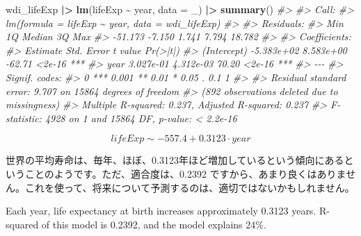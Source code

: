 \documentclass[
  xelatex, ja=standard]{bxjsbook}
\newenvironment{Shaded}{\begin{snugshade}}{\end{snugshade}}
\newcommand{\AttributeTok}[1]{\textcolor[rgb]{0.13,0.29,0.53}{#1}}
\newcommand{\CommentTok}[1]{\textcolor[rgb]{0.56,0.35,0.01}{\textit{#1}}}
\newcommand{\FunctionTok}[1]{\textcolor[rgb]{0.13,0.29,0.53}{\textbf{#1}}}
\newcommand{\NormalTok}[1]{#1}
\newcommand{\SpecialCharTok}[1]{\textcolor[rgb]{0.81,0.36,0.00}{\textbf{#1}}}
\theoremstyle{definition}
\theoremstyle{definition}
\theoremstyle{definition}
\theoremstyle{definition}
\theoremstyle{remark}
\begin{document}
\begin{Shaded}
\begin{Highlighting}[]
\NormalTok{wdi\_lifeExp }\SpecialCharTok{|\textgreater{}} \FunctionTok{lm}\NormalTok{(lifeExp }\SpecialCharTok{\textasciitilde{}}\NormalTok{ year, }\AttributeTok{data =}\NormalTok{ \_) }\SpecialCharTok{|\textgreater{}} \FunctionTok{summary}\NormalTok{()}
\CommentTok{\#\textgreater{} }
\CommentTok{\#\textgreater{} Call:}
\CommentTok{\#\textgreater{} lm(formula = lifeExp \textasciitilde{} year, data = wdi\_lifeExp)}
\CommentTok{\#\textgreater{} }
\CommentTok{\#\textgreater{} Residuals:}
\CommentTok{\#\textgreater{}     Min      1Q  Median      3Q     Max }
\CommentTok{\#\textgreater{} {-}51.173  {-}7.150   1.741   7.794  18.782 }
\CommentTok{\#\textgreater{} }
\CommentTok{\#\textgreater{} Coefficients:}
\CommentTok{\#\textgreater{}               Estimate Std. Error t value Pr(\textgreater{}|t|)    }
\CommentTok{\#\textgreater{} (Intercept) {-}5.383e+02  8.583e+00  {-}62.71   \textless{}2e{-}16 ***}
\CommentTok{\#\textgreater{} year         3.027e{-}01  4.312e{-}03   70.20   \textless{}2e{-}16 ***}
\CommentTok{\#\textgreater{} {-}{-}{-}}
\CommentTok{\#\textgreater{} Signif. codes:  }
\CommentTok{\#\textgreater{} 0 \textquotesingle{}***\textquotesingle{} 0.001 \textquotesingle{}**\textquotesingle{} 0.01 \textquotesingle{}*\textquotesingle{} 0.05 \textquotesingle{}.\textquotesingle{} 0.1 \textquotesingle{} \textquotesingle{} 1}
\CommentTok{\#\textgreater{} }
\CommentTok{\#\textgreater{} Residual standard error: 9.707 on 15864 degrees of freedom}
\CommentTok{\#\textgreater{}   (892 observations deleted due to missingness)}
\CommentTok{\#\textgreater{} Multiple R{-}squared:  0.237,  Adjusted R{-}squared:  0.237 }
\CommentTok{\#\textgreater{} F{-}statistic:  4928 on 1 and 15864 DF,  p{-}value: \textless{} 2.2e{-}16}
\end{Highlighting}
\end{Shaded}

\[lifeExp \sim -557.4 + 0.3123 \cdot year\]

世界の平均寿命は、毎年、ほぼ、0.3123年ほど増加しているという傾向にあるということのようです。ただ、適合度は、0.2392 ですから、あまり良くはありません。これを使って、将来について予測するのは、適切ではないかもしれません。

Each year, life expectancy at birth increases approximately 0.3123 years. R-squared of this model is 0.2392, and the model explains 24\%.
\end{document}
